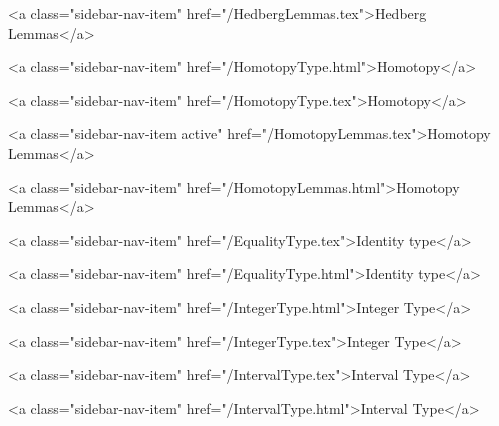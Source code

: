       
    
      
        
          <a class="sidebar-nav-item" href="/HedbergLemmas.tex">Hedberg Lemmas</a>
        
      
    
      
        
          <a class="sidebar-nav-item" href="/HomotopyType.html">Homotopy</a>
        
      
    
      
        
          <a class="sidebar-nav-item" href="/HomotopyType.tex">Homotopy</a>
        
      
    
      
        
          <a class="sidebar-nav-item active" href="/HomotopyLemmas.tex">Homotopy Lemmas</a>
        
      
    
      
        
          <a class="sidebar-nav-item" href="/HomotopyLemmas.html">Homotopy Lemmas</a>
        
      
    
      
        
          <a class="sidebar-nav-item" href="/EqualityType.tex">Identity type</a>
        
      
    
      
        
          <a class="sidebar-nav-item" href="/EqualityType.html">Identity type</a>
        
      
    
      
        
          <a class="sidebar-nav-item" href="/IntegerType.html">Integer Type</a>
        
      
    
      
        
          <a class="sidebar-nav-item" href="/IntegerType.tex">Integer Type</a>
        
      
    
      
        
          <a class="sidebar-nav-item" href="/IntervalType.tex">Interval Type</a>
        
      
    
      
        
          <a class="sidebar-nav-item" href="/IntervalType.html">Interval Type</a>
        
